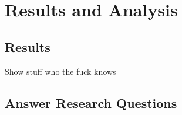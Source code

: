 
\chapter{Results and Analysis}


\section{Results}

Show stuff who the fuck knows

\section{Answer Research Questions}